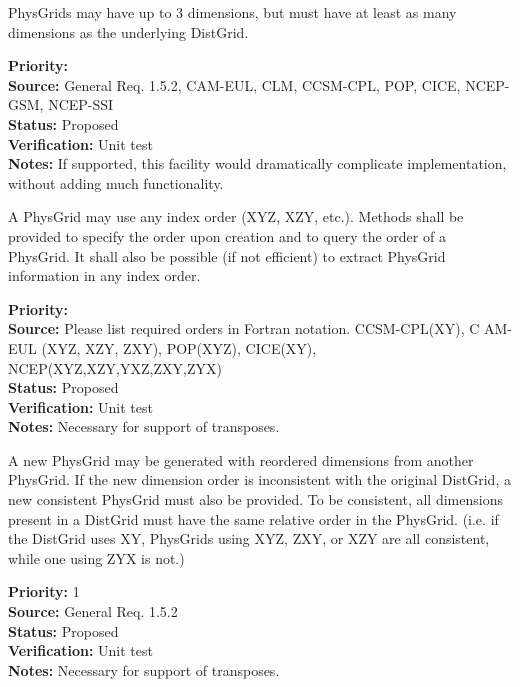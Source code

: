 PhysGrids may have up to 3 dimensions, but must have at least as many dimensions as the
underlying DistGrid. 
\begin{reqlist}
{\bf Priority:}  \\
{\bf Source:} General Req. 1.5.2, CAM-EUL, CLM, CCSM-CPL, POP, CICE, NCEP-GSM, NCEP-SSI \\
{\bf Status:} Proposed \\
{\bf Verification:} Unit test\\
{\bf Notes:} If supported, this facility would dramatically complicate implementation,
without adding much functionality.
\end{reqlist}

A PhysGrid may use any index order (XYZ, XZY, etc.).  Methods shall be provided to
specify the order upon creation and to query the order of a PhysGrid.  It shall
also be possible (if not efficient) to extract PhysGrid information in any index
order.
\begin{reqlist}
{\bf Priority:}  \\
{\bf Source:} Please list required orders in Fortran notation. CCSM-CPL(XY), C
AM-EUL (XYZ, XZY, ZXY), POP(XYZ), CICE(XY), NCEP(XYZ,XZY,YXZ,ZXY,ZYX) \\
{\bf Status:} Proposed \\
{\bf Verification:} Unit test\\
{\bf Notes:} Necessary for support of transposes.
\end{reqlist}

A new PhysGrid may be generated with reordered dimensions from another PhysGrid.
If the new dimension order is inconsistent with the original DistGrid, a new
consistent PhysGrid must also be provided.  To be consistent, all dimensions present
in a DistGrid must have the same relative order in the PhysGrid.  (i.e. if the
DistGrid uses XY, PhysGrids using XYZ, ZXY, or XZY are all consistent, while one using
ZYX is not.)
\begin{reqlist}
{\bf Priority:} 1 \\
{\bf Source:} General Req. 1.5.2 \\
{\bf Status:} Proposed \\
{\bf Verification:} Unit test\\
{\bf Notes:} Necessary for support of transposes.
\end{reqlist}

